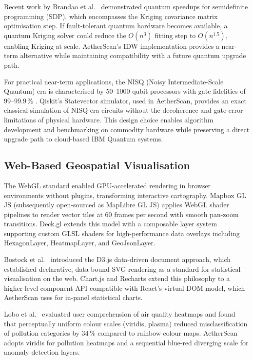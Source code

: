 \documentclass[12pt,a4paper]{article}
\begin{document}
Recent work by Brandao et al.~\cite{brandao2019} demonstrated quantum speedups
for semidefinite programming (SDP), which encompasses the Kriging covariance
matrix optimisation step. If fault-tolerant quantum hardware becomes available,
a quantum Kriging solver could reduce the $O(n^3)$ fitting step to $O(n^{1.5})$,
enabling Kriging at scale. AetherScan's IDW implementation provides a
near-term alternative while maintaining compatibility with a future quantum
upgrade path.

For practical near-term applications, the NISQ (Noisy Intermediate-Scale
Quantum) era is characterised by 50--1000 qubit processors with gate fidelities
of 99--99.9\,\% \cite{preskill2018}. Qiskit's Statevector simulator, used in
AetherScan, provides an exact classical simulation of NISQ-era circuits without
the decoherence and gate-error limitations of physical hardware. This design
choice enables algorithm development and benchmarking on commodity hardware
while preserving a direct upgrade path to cloud-based IBM Quantum systems.

\subsection{Web-Based Geospatial Visualisation}
\label{sec:litreview:vis}

The WebGL standard \cite{webgl2011} enabled GPU-accelerated rendering in
browser environments without plugins, transforming interactive cartography.
Mapbox GL JS (subsequently open-sourced as MapLibre GL JS) applies WebGL
shader pipelines to render vector tiles at 60 frames per second with smooth
pan-zoom transitions. Deck.gl \cite{deckgl2019} extends this model with a
composable layer system supporting custom GLSL shaders for high-performance
data overlays including HexagonLayer, HeatmapLayer, and GeoJsonLayer.

Bostock et al.~\cite{bostock2011} introduced the D3.js data-driven document
approach, which established declarative, data-bound SVG rendering as a standard
for statistical visualisation on the web. Chart.js and Recharts extend this
philosophy to a higher-level component API compatible with React's virtual DOM
model, which AetherScan uses for in-panel statistical charts.

Lobo et al.~\cite{lobo2015} evaluated user comprehension of air quality heatmaps
and found that perceptually uniform colour scales (viridis, plasma) reduced
misclassification of pollution categories by 34\,\% compared to rainbow colour
maps. AetherScan adopts viridis for pollution heatmaps and a sequential blue-red
diverging scale for anomaly detection layers.
\end{document}
